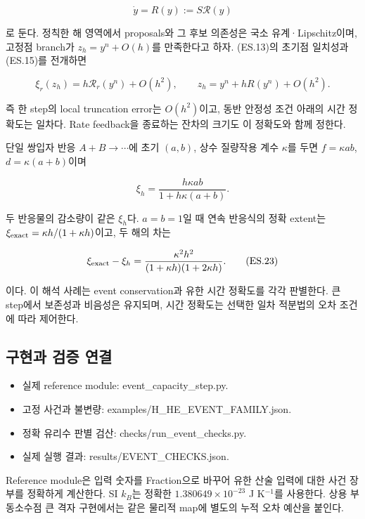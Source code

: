 \documentclass[11pt,a4paper]{article}
\providecommand{\tightlist}{\setlength{\itemsep}{2pt}\setlength{\parskip}{0pt}}
\begin{document}
\[
\dot y=R(y):=S\mathcal R(y)
\tag{ES.20}
\]

로 둔다. 정칙한 해 영역에서 proposals와 그 후보 의존성은 국소 유계·Lipschitz이며, 고정점 branch가 \(z_h=y^n+O(h)\)를 만족한다고 하자. (ES.13)의 초기점 일치성과 (ES.15)를 전개하면

\[
\xi_r(z_h)=h\mathcal R_r(y^n)+O(h^2),\qquad
z_h=y^n+hR(y^n)+O(h^2).
\tag{ES.21}
\]

즉 한 step의 local truncation error는 \(O(h^2)\)이고, 동반 안정성 조건 아래의 시간 정확도는 일차다. Rate feedback을 종료하는 잔차의 크기도 이 정확도와 함께 정한다.

단일 쌍입자 반응 \(A+B\to\cdots\)에 초기 \((a,b)\), 상수 질량작용 계수 \(\kappa\)를 두면 \(f=\kappa ab\), \(d=\kappa(a+b)\)이며

\[
\xi_h=\frac{h\kappa ab}{1+h\kappa(a+b)}.
\tag{ES.22}
\]

두 반응물의 감소량이 같은 \(\xi_h\)다. \(a=b=1\)일 때 연속 반응식의 정확 extent는 \(\xi_{\rm exact}=\kappa h/(1+\kappa h)\)이고, 두 해의 차는

\[
\xi_{\rm exact}-\xi_h
=
\frac{\kappa^2h^2}
{(1+\kappa h)(1+2\kappa h)}.
\tag{ES.23}
\]

이다. 이 해석 사례는 event conservation과 유한 시간 정확도를 각각 판별한다. 큰 step에서 보존성과 비음성은 유지되며, 시간 정확도는 선택한 일차 적분법의 오차 조건에 따라 제어한다.

\hypertarget{uxad6cuxd604uxacfc-uxac80uxc99d-uxc5f0uxacb0}{%
\subsection{구현과 검증 연결}\label{uxad6cuxd604uxacfc-uxac80uxc99d-uxc5f0uxacb0}}

\begin{itemize}
\tightlist
\item
  실제 reference module: event\_capacity\_step.py.
\item
  고정 사건과 불변량: examples/H\_HE\_EVENT\_FAMILY.json.
\item
  정확 유리수 판별 검산: checks/run\_event\_checks.py.
\item
  실제 실행 결과: results/EVENT\_CHECKS.json.
\end{itemize}

Reference module은 입력 숫자를 Fraction으로 바꾸어 유한 산술 입력에 대한 사건 장부를 정확하게 계산한다. SI \(k_B\)는 정확한 \(1.380649\times10^{-23}\) J K\(^{-1}\)를 사용한다. 상용 부동소수점 큰 격자 구현에서는 같은 물리적 map에 별도의 누적 오차 예산을 붙인다.
\end{document}
